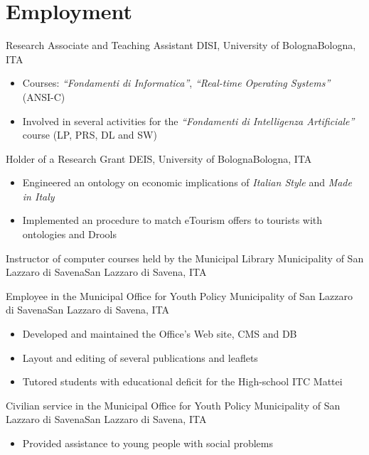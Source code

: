 \section{Employment}

%
{Research Associate and Teaching Assistant}%
{DISI, University of Bologna}{Bologna, ITA}{}{\begin{itemize}
\item Courses: \emph{``Fondamenti di Informatica''}, \emph{``Real\--time Operating Systems''} (ANSI-C)
\item Involved in several activities for the \emph{``Fondamenti di Intelligenza Artificiale''} course (LP, PRS, DL and SW)
\end{itemize}}

%
{Holder of a Research Grant}%
{DEIS, University of Bologna}{Bologna, ITA}{}{\begin{itemize}
\item Engineered an ontology on economic implications of \emph{Italian Style} and \emph{Made in Italy}
\item Implemented an procedure to match eTourism offers to tourists with ontologies and Drools
\end{itemize}}

%
{Instructor of computer courses held by the Municipal Library}%
{Municipality of San Lazzaro di Savena}{San Lazzaro di Savena, ITA}{}{}

%
{Employee in the Municipal Office for Youth Policy}%
{Municipality of San Lazzaro di Savena}{San Lazzaro di Savena, ITA}{}{\begin{itemize}
\item Developed and maintained the Office's Web site, CMS and DB
\item Layout and editing of several publications and leaflets
\item Tutored students with educational deficit for the High\--school ITC Mattei
\end{itemize}}

%
{Civilian service in the Municipal Office for Youth Policy}%
{Municipality of San Lazzaro di Savena}{San Lazzaro di Savena, ITA}{}{\begin{itemize}
\item Provided assistance to young people with social problems
\end{itemize}}
